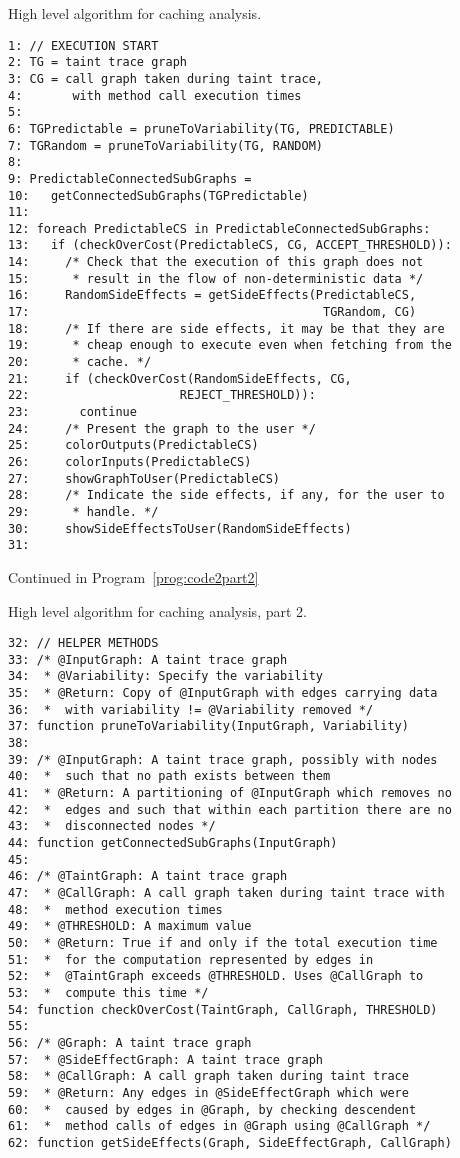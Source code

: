 \documentclass[msc,oneside]{ubcthesis}
\begin{document}
\begin{Program}
  \caption{\label{prog:code2} High level algorithm for caching analysis.}
\begin{verbatim}
1: // EXECUTION START
2: TG = taint trace graph
3: CG = call graph taken during taint trace, 
4:       with method call execution times
5: 
6: TGPredictable = pruneToVariability(TG, PREDICTABLE)
7: TGRandom = pruneToVariability(TG, RANDOM)
8: 
9: PredictableConnectedSubGraphs = 
10:   getConnectedSubGraphs(TGPredictable)
11: 
12: foreach PredictableCS in PredictableConnectedSubGraphs:
13:   if (checkOverCost(PredictableCS, CG, ACCEPT_THRESHOLD)):
14:     /* Check that the execution of this graph does not 
15:      * result in the flow of non-deterministic data */
16:     RandomSideEffects = getSideEffects(PredictableCS, 
17:                                         TGRandom, CG)
18:     /* If there are side effects, it may be that they are 
19:      * cheap enough to execute even when fetching from the
20:      * cache. */
21:     if (checkOverCost(RandomSideEffects, CG, 
22:                     REJECT_THRESHOLD)):
23:       continue
24:     /* Present the graph to the user */
25:     colorOutputs(PredictableCS)
26:     colorInputs(PredictableCS)
27:     showGraphToUser(PredictableCS)
28:     /* Indicate the side effects, if any, for the user to 
29:      * handle. */
30:     showSideEffectsToUser(RandomSideEffects)
31:   
\end{verbatim}
Continued in Program~\ref{prog:code2part2}
\end{Program}
\begin{Program}
  \caption{\label{prog:code2part2} High level algorithm for caching analysis, part 2.}
\begin{verbatim}
32: // HELPER METHODS
33: /* @InputGraph: A taint trace graph
34:  * @Variability: Specify the variability 
35:  * @Return: Copy of @InputGraph with edges carrying data
36:  *  with variability != @Variability removed */
37: function pruneToVariability(InputGraph, Variability)
38:   
39: /* @InputGraph: A taint trace graph, possibly with nodes
40:  *  such that no path exists between them
41:  * @Return: A partitioning of @InputGraph which removes no 
42:  *  edges and such that within each partition there are no
43:  *  disconnected nodes */
44: function getConnectedSubGraphs(InputGraph)
45: 
46: /* @TaintGraph: A taint trace graph
47:  * @CallGraph: A call graph taken during taint trace with 
48:  *  method execution times
49:  * @THRESHOLD: A maximum value
50:  * @Return: True if and only if the total execution time 
51:  *  for the computation represented by edges in 
52:  *  @TaintGraph exceeds @THRESHOLD. Uses @CallGraph to
53:  *  compute this time */
54: function checkOverCost(TaintGraph, CallGraph, THRESHOLD)
55: 
56: /* @Graph: A taint trace graph
57:  * @SideEffectGraph: A taint trace graph
58:  * @CallGraph: A call graph taken during taint trace
59:  * @Return: Any edges in @SideEffectGraph which were 
60:  *  caused by edges in @Graph, by checking descendent
61:  *  method calls of edges in @Graph using @CallGraph */
62: function getSideEffects(Graph, SideEffectGraph, CallGraph)
\end{verbatim}
\end{Program}
\end{document}
